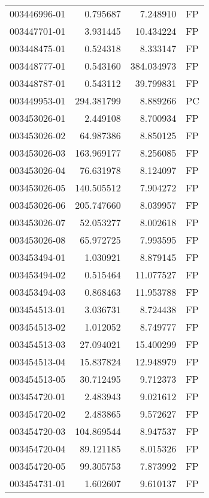 \begin{tabular}{lrrl}
003446996-01 &    0.795687 &       7.248910 &   FP \\
003447701-01 &    3.931445 &      10.434224 &   FP \\
003448475-01 &    0.524318 &       8.333147 &   FP \\
003448777-01 &    0.543160 &     384.034973 &   FP \\
003448787-01 &    0.543112 &      39.799831 &   FP \\
003449953-01 &  294.381799 &       8.889266 &   PC \\
003453026-01 &    2.449108 &       8.700934 &   FP \\
003453026-02 &   64.987386 &       8.850125 &   FP \\
003453026-03 &  163.969177 &       8.256085 &   FP \\
003453026-04 &   76.631978 &       8.124097 &   FP \\
003453026-05 &  140.505512 &       7.904272 &   FP \\
003453026-06 &  205.747660 &       8.039957 &   FP \\
003453026-07 &   52.053277 &       8.002618 &   FP \\
003453026-08 &   65.972725 &       7.993595 &   FP \\
003453494-01 &    1.030921 &       8.879145 &   FP \\
003453494-02 &    0.515464 &      11.077527 &   FP \\
003453494-03 &    0.868463 &      11.953788 &   FP \\
003454513-01 &    3.036731 &       8.724438 &   FP \\
003454513-02 &    1.012052 &       8.749777 &   FP \\
003454513-03 &   27.094021 &      15.400299 &   FP \\
003454513-04 &   15.837824 &      12.948979 &   FP \\
003454513-05 &   30.712495 &       9.712373 &   FP \\
003454720-01 &    2.483943 &       9.021612 &   FP \\
003454720-02 &    2.483865 &       9.572627 &   FP \\
003454720-03 &  104.869544 &       8.947537 &   FP \\
003454720-04 &   89.121185 &       8.015326 &   FP \\
003454720-05 &   99.305753 &       7.873992 &   FP \\
003454731-01 &    1.602607 &       9.610137 &   FP \\

\end{tabular}
